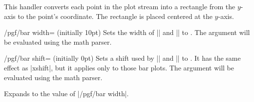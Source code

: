 \begin{command}{\pgfplothandlerxbar}
  This handler converts each point in the plot stream into a rectangle
  from the $y$-axis to the point's coordinate. The rectangle is placed
  centered at the $y$-axis. 
  
\begin{codeexample}[]
\end{codeexample}
\end{command}

\label{key-bar-width}%
\begin{key}{/pgf/bar width= (initially 10pt)}
  Sets the width of |\pgfplothandlerxbar| and |\pgfplothandlerybar| to
  . The argument  will be evaluated
  using the math parser. 
\end{key}

\label{key-bar-shift}%
\begin{key}{/pgf/bar shift= (initially 0pt)}
  Sets a shift used by |\pgfplothandlerxbar| and |\pgfplothandlerybar|
  to . It has the same effect as |xshift|, but it
  applies only to those bar plots. The argument  will
  be evaluated using the math parser. 
\end{key}

\begin{command}{\pgfplotbarwidth}
  Expands to the value of |/pgf/bar width|.
\end{command}


